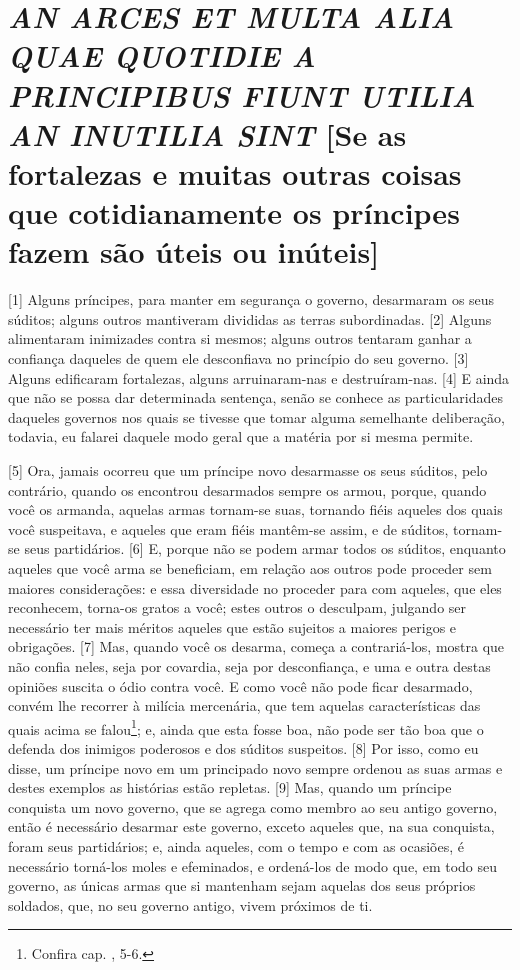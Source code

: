 \quebra\section{\emph{AN ARCES ET MULTA ALIA QUAE QUOTIDIE A PRINCIPIBUS FIUNT UTILIA AN
INUTILIA SINT}
{[}Se as fortalezas e muitas outras coisas que cotidianamente os
príncipes fazem são úteis ou inúteis{]}}

{[}1{]} Alguns príncipes, para manter em segurança o governo, desarmaram
os seus súditos; alguns outros mantiveram divididas as terras
subordinadas. {[}2{]} Alguns alimentaram inimizades contra si mesmos;
alguns outros tentaram ganhar a confiança daqueles de quem ele
desconfiava no princípio do seu governo. {[}3{]} Alguns edificaram
fortalezas, alguns arruinaram-nas e destruíram-nas. {[}4{]} E ainda que
não se possa dar determinada sentença, senão se conhece as
particularidades daqueles governos nos quais se tivesse que tomar alguma
semelhante deliberação, todavia, eu falarei daquele modo geral que a
matéria por si mesma permite.

{[}5{]} Ora, jamais ocorreu que um príncipe novo desarmasse os seus
súditos, pelo contrário, quando os encontrou desarmados sempre os armou,
porque, quando você os armanda, aquelas armas tornam-se suas, tornando
fiéis aqueles dos quais você suspeitava, e aqueles que eram fiéis
mantêm-se assim, e de súditos, tornam-se seus partidários. {[}6{]} E,
porque não se podem armar todos os súditos, enquanto aqueles que você
arma se beneficiam, em relação aos outros pode proceder sem maiores
considerações: e essa diversidade no proceder para com aqueles, que eles
reconhecem, torna-os gratos a você; estes outros o desculpam, julgando
ser necessário ter mais méritos aqueles que estão sujeitos a maiores
perigos e obrigações. {[}7{]} Mas, quando você os desarma, começa a
contrariá-los, mostra que não confia neles, seja por covardia, seja por
desconfiança, e uma e outra destas opiniões suscita o ódio contra você.
E como você não pode ficar desarmado, convém lhe recorrer à milícia
mercenária, que tem aquelas características das quais acima se
falou\footnote{Confira cap. , 5-6.}; e, ainda que esta fosse boa,
não pode ser tão boa que o defenda dos inimigos poderosos e dos súditos
suspeitos. {[}8{]} Por isso, como eu disse, um príncipe novo em um
principado novo sempre ordenou as suas armas e destes exemplos as
histórias estão repletas. {[}9{]} Mas, quando um príncipe conquista um
novo governo, que se agrega como membro ao seu antigo governo, então é
necessário desarmar este governo, exceto aqueles que, na sua conquista,
foram seus partidários; e, ainda aqueles, com o tempo e com as ocasiões,
é necessário torná-los moles e efeminados, e ordená-los de modo que, em
todo seu governo, as únicas armas que si mantenham sejam aquelas dos
seus próprios soldados, que, no seu governo antigo, vivem próximos de
ti.


